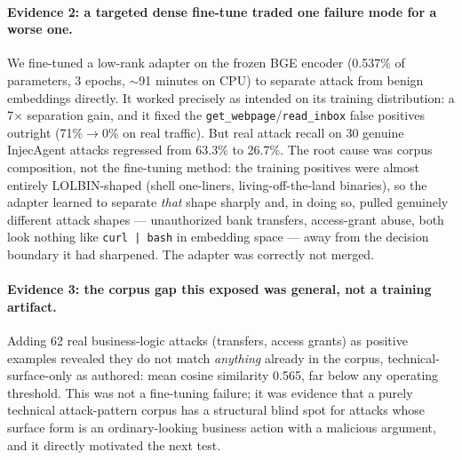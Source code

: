 \documentclass[sigconf,anonymous,review]{acmart}
\begin{document}
\paragraph{Evidence 2: a targeted dense fine-tune traded one failure mode for
a worse one.} We fine-tuned a low-rank adapter on the frozen BGE encoder
(0.537\% of parameters, 3 epochs, $\sim$91 minutes on CPU) to separate attack
from benign embeddings directly. It worked precisely as intended on its
training distribution: a 7$\times$ separation gain, and it fixed the
\texttt{get\_webpage}/\texttt{read\_inbox} false positives outright
(71\%$\to$0\% on real traffic). But real attack recall on 30 genuine
InjecAgent attacks regressed from 63.3\% to 26.7\%. The root cause was corpus
composition, not the fine-tuning method: the training positives were almost
entirely LOLBIN-shaped (shell one-liners, living-off-the-land binaries), so
the adapter learned to separate \emph{that} shape sharply and, in doing so,
pulled genuinely different attack shapes --- unauthorized bank transfers,
access-grant abuse, both look nothing like \texttt{curl\,|\,bash} in
embedding space --- away from the decision boundary it had sharpened. The
adapter was correctly not merged.

\paragraph{Evidence 3: the corpus gap this exposed was general, not a training
artifact.} Adding 62 real business-logic attacks (transfers, access grants)
as positive examples revealed they do not match \emph{anything} already in
the corpus, technical-surface-only as authored: mean cosine similarity 0.565,
far below any operating threshold. This was not a fine-tuning failure; it was
evidence that a purely technical attack-pattern corpus has a structural blind
spot for attacks whose surface form is an ordinary-looking business action
with a malicious argument, and it directly motivated the next test.
\end{document}
